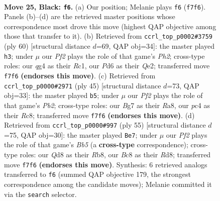 \documentclass[11pt]{article}
\begin{document}
\clearpage

\begin{figure}[p]\centering
\begin{subfigure}{0.46\textwidth}\centering
\resizebox{\linewidth}{!}{%
\newchessgame
\chessboard[
  setfen={2bq1rk1/p3ppb1/P2p4/2p2PB1/2P1B1Q1/6P1/1r2N2K/R4R2 b - - 5 25},
  showmover=false,
  pgfstyle=straightmove, color=movearrow, markmove={f7-f6}
]}
\caption{}
\end{subfigure}\hfill
\begin{subfigure}{0.46\textwidth}\centering
\resizebox{\linewidth}{!}{%
\newchessgame
\chessboard[
  setfen={2r3k1/1bqn1r1p/pp2p1p1/4p1B1/1PP5/3BR3/P3Q1PP/2R3K1 w - - 2 31},
  showmover=false,
  pgfstyle=straightmove, color=movearrow, markmove={h2-h3}
]}
\caption{}
\end{subfigure}
\\[4pt]
\begin{subfigure}{0.46\textwidth}\centering
\resizebox{\linewidth}{!}{%
\newchessgame
\chessboard[
  setfen={r1r1q1k1/1p3pb1/2p1b1pp/8/7B/1P1BP2P/2Q2PP1/1R1R2K1 b - - 0 23},
  showmover=false,
  pgfstyle=straightmove, color=movearrow, markmove={b7-b5}
]}
\caption{}
\end{subfigure}\hfill
\begin{subfigure}{0.46\textwidth}\centering
\resizebox{\linewidth}{!}{%
\newchessgame
\chessboard[
  setfen={1r1r2k1/2q2pp1/p1p1p1n1/7N/1bPP2P1/7R/P3QPK1/B2R4 b - - 4 28},
  showmover=false,
  pgfstyle=straightmove, color=movearrow, markmove={b4-e7}
]}
\caption{}
\end{subfigure}
\caption{\textbf{Move 25, Black: \texttt{f6}.} (a) Our position; Melanie plays \texttt{f6} (\texttt{f7f6}). Panels (b)--(d) are the retrieved master positions whose correspondence most drove this move (highest QAP objective among those that transfer to it). (b) Retrieved from \texttt{ccrl\_top\_p0002\#3759} (ply 60) [structural distance $d$=69, QAP obj=34]: the master played \texttt{h3}; under $\mu$ our \emph{Pf2} plays the role of that game's \emph{Ph2}; cross-type roles: our \emph{q}g4 as their \emph{R}c1, our \emph{P}d6 as their \emph{Q}e2; transferred move \texttt{f7f6} \textbf{(endorses this move)}. (c) Retrieved from \texttt{ccrl\_top\_p0000\#2971} (ply 45) [structural distance $d$=73, QAP obj=33]: the master played \texttt{b5}; under $\mu$ our \emph{Pf2} plays the role of that game's \emph{Pb2}; cross-type roles: our \emph{B}g7 as their \emph{R}a8, our \emph{p}c4 as their \emph{R}c8; transferred move \texttt{f7f6} \textbf{(endorses this move)}. (d) Retrieved from \texttt{ccrl\_top\_p0000\#997} (ply 55) [structural distance $d$=75, QAP obj=30]: the master played \texttt{Be7}; under $\mu$ our \emph{Pf2} plays the role of that game's \emph{Bb5} (a \textbf{cross-type} correspondence); cross-type roles: our \emph{Q}d8 as their \emph{R}b8, our \emph{B}c8 as their \emph{R}d8; transferred move \texttt{f7f6} \textbf{(endorses this move)}. Synthesis: 6 retrieved analogs transferred to \texttt{f6} (summed QAP objective 179, the strongest correspondence among the candidate moves); Melanie committed it via the \texttt{search} selector.}
\label{fig:thought-m49}
\end{figure}
\end{document}
